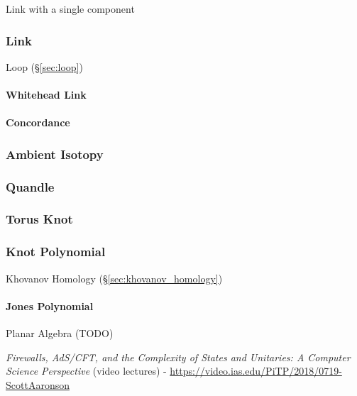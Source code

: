 Link with a single component %



\subsubsection{Link} \label{sec:link}

Loop (\S\ref{sec:loop})



\paragraph{Whitehead Link} \label{sec:whitehead_link}\hfill

\paragraph{Concordance} \label{sec:concordance}\hfill



\subsubsection{Ambient Isotopy} \label{sec:ambient_isotopy}

\subsubsection{Quandle} \label{sec:quandle}

\subsubsection{Torus Knot} \label{sec:torus_knot}

\subsubsection{Knot Polynomial} \label{sec:knot_polynomial}

\fist Khovanov Homology (\S\ref{sec:khovanov_homology})



\paragraph{Jones Polynomial} \label{sec:jones_polynomial}\hfill

Planar Algebra (TODO)

\asterism

\emph{Firewalls, AdS/CFT, and the Complexity of States and Unitaries: A Computer
  Science Perspective}
(video lectures)
-
\url{https://video.ias.edu/PiTP/2018/0719-ScottAaronson}

